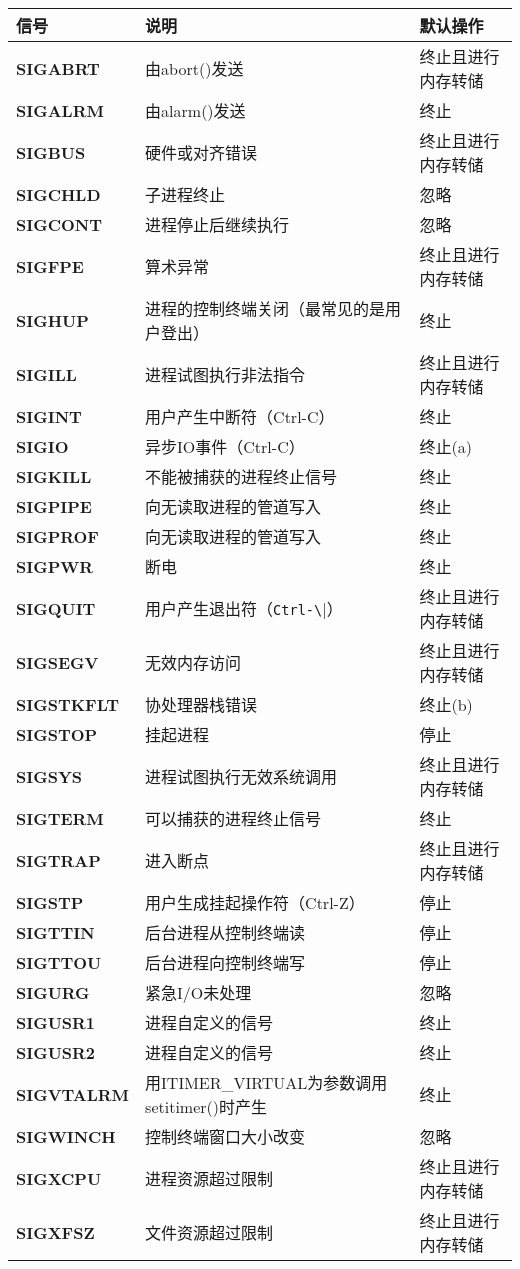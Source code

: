 \begin{center}
\begin{tabular}{p{2.2cm}p{7cm}p{4cm}}\toprule
\rowcolor[gray]{.9}
\textbf{信号} & \textbf{说明} & \textbf{默认操作}\\ \midrule
\textbf{SIGABRT} & 由abort()发送 & 终止且进行内存转储\\
\textbf{SIGALRM} & 由alarm()发送 & 终止\\
\textbf{SIGBUS} & 硬件或对齐错误 & 终止且进行内存转储\\
\textbf{SIGCHLD} & 子进程终止 & 忽略\\
\textbf{SIGCONT} & 进程停止后继续执行 & 忽略\\
\textbf{SIGFPE} & 算术异常 & 终止且进行内存转储\\
\textbf{SIGHUP} & 进程的控制终端关闭（最常见的是用户登出） & 终止\\
\textbf{SIGILL} & 进程试图执行非法指令 & 终止且进行内存转储\\
\textbf{SIGINT} & 用户产生中断符（Ctrl-C） & 终止\\
\textbf{SIGIO} & 异步IO事件（Ctrl-C） & 终止(a)\\
\textbf{SIGKILL} & 不能被捕获的进程终止信号 & 终止\\
\textbf{SIGPIPE} & 向无读取进程的管道写入 & 终止\\
\textbf{SIGPROF} & 向无读取进程的管道写入 & 终止\\
\textbf{SIGPWR} & 断电 & 终止\\
\textbf{SIGQUIT} & 用户产生退出符（\verb|Ctrl-\|） & 终止且进行内存转储\\
\textbf{SIGSEGV} & 无效内存访问 & 终止且进行内存转储\\
\textbf{SIGSTKFLT} & 协处理器栈错误 & 终止(b)\\
\textbf{SIGSTOP} & 挂起进程 & 停止\\
\textbf{SIGSYS} & 进程试图执行无效系统调用 & 终止且进行内存转储\\
\textbf{SIGTERM} & 可以捕获的进程终止信号 & 终止\\
\textbf{SIGTRAP} & 进入断点 & 终止且进行内存转储\\
\textbf{SIGSTP} & 用户生成挂起操作符（Ctrl-Z） & 停止\\
\textbf{SIGTTIN} & 后台进程从控制终端读 & 停止\\
\textbf{SIGTTOU} & 后台进程向控制终端写 & 停止\\
\textbf{SIGURG} & 紧急I/O未处理 & 忽略\\
\textbf{SIGUSR1} & 进程自定义的信号 & 终止\\
\textbf{SIGUSR2} & 进程自定义的信号 & 终止\\
\textbf{SIGVTALRM} & 用ITIMER\_VIRTUAL为参数调用setitimer()时产生 & 终止\\
\textbf{SIGWINCH} & 控制终端窗口大小改变 & 忽略\\
\textbf{SIGXCPU} & 进程资源超过限制 & 终止且进行内存转储\\
\textbf{SIGXFSZ} & 文件资源超过限制 & 终止且进行内存转储\\ \bottomrule
\end{tabular}
\end{center}

